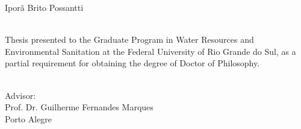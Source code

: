 \documentclass[./main_en.tex]{subfiles}
\begin{document}
\doublespacing %
\large

\newpage
\renewcommand{\headrulewidth}{0pt}
\thispagestyle{fancy}
\fancyhf{} %
\fancyfoot{} %
\fancyfoot[C]{\thepage}

\begin{center}
	\selectfont Iporã Brito Possantti\\
	\vspace{60mm}
	\selectfont \docTitleEn\\
	\vspace{20mm}
\end{center}
\begin{adjustwidth}{150pt}{0pt}
	\singlespacing
        \small
	\selectfont Thesis presented to the Graduate Program in Water Resources and Environmental Sanitation at the Federal University of Rio Grande do Sul, as a partial requirement for obtaining the degree of Doctor of Philosophy. \\ \\ 
\end{adjustwidth}
\begin{center}
        \selectfont Advisor:\\
        \selectfont Prof. Dr. Guilherme Fernandes Marques \\
	\vspace{70mm}
	\selectfont Porto Alegre\\
\end{center}
\clearpage
\end{document}
